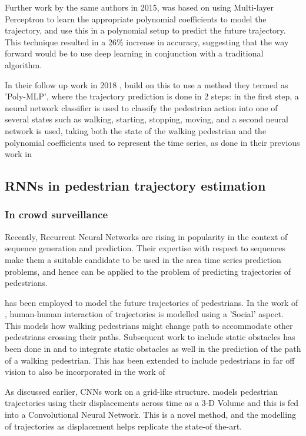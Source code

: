 Further work by the same authors in 2015, was based on using Multi-layer Perceptron to learn the appropriate polynomial coefficients to model the trajectory, and use this in a polynomial setup to predict the future trajectory. This technique resulted in a 26\% increase in accuracy, suggesting that the way forward would be to use deep learning in conjunction with a traditional algorithm.

In their follow up work in 2018 \cite{goldhammer_intentions_2018}, build on this to use a method they termed as 'Poly-MLP', where the trajectory prediction is done in 2 steps: in the first step, a neural network classifier is used to classify the pedestrian action into one of several states such as walking, starting, stopping, moving, and a second neural network is used, taking both the state of the walking pedestrian and the polynomial coefficients used to represent the time series, as done in their previous work in \cite{goldhammer_camera_2015}



\subsection{RNNs in pedestrian trajectory estimation}
\subsubsection{In crowd surveillance}
Recently, Recurrent Neural Networks are rising in popularity in the context of sequence generation and prediction. Their expertise with respect to sequences make them a suitable candidate to be used in the area  time series prediction problems, and hence can be applied to the problem of predicting trajectories of pedestrians. 

has been employed to model the future trajectories of pedestrians. In the work of \cite{alahi_social_2016}, human-human interaction of trajectories is modelled using a 'Social' aspect. This models how walking pedestrians might change path to accommodate other pedestrians crossing their paths. Subsequent work to include static obstacles has been done in \cite{varshneya_human_2017} and \cite{bartoli_context-aware_2017} to integrate static obstacles as well in the prediction of the path of a walking pedestrian. This has been extended to include pedestrians in far off vision to also be incorporated in the work of \cite{vemula_social_2017}

As discussed earlier, CNNs work on a grid-like structure. \cite{leibe_pedestrian_2016} models pedestrian trajectories using their displacements across time as a 3-D Volume and this is fed into a Convolutional Neural Network. This is a novel method, and the modelling of trajectories as displacement helps replicate the state-of the-art.



